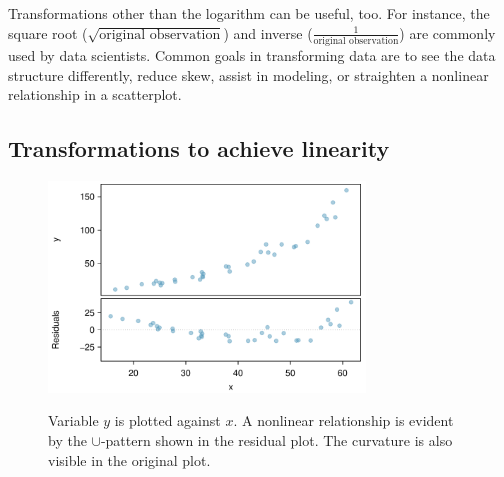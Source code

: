 Transformations other than the logarithm can be useful, too.
For instance, the square root
($\sqrt{\text{original observation}}$) and inverse
($\frac{1}{\text{original observation}}$) are commonly used
by data scientists.
Common goals in transforming data are to see the data
structure differently, reduce skew, assist in modeling,
or straighten a nonlinear relationship in a scatterplot.



\D{\newpage}
\subsection{Transformations to achieve linearity}

\begin{figure}[ht]
   \begin{center}
   \includegraphics[width=0.75\textwidth]{ch_regr_simple_linear/figures/NeedsTransform/NeedsTransform-PreTransform}
\label{pretransform}
   \caption{Variable $y$ is plotted against $x$. A nonlinear relationship is evident by the $\cup$-pattern shown in the residual plot.  The curvature is also visible in the original plot.}
   \label{NeedsTransform-PreTransform}
\end{center}
\end{figure}



